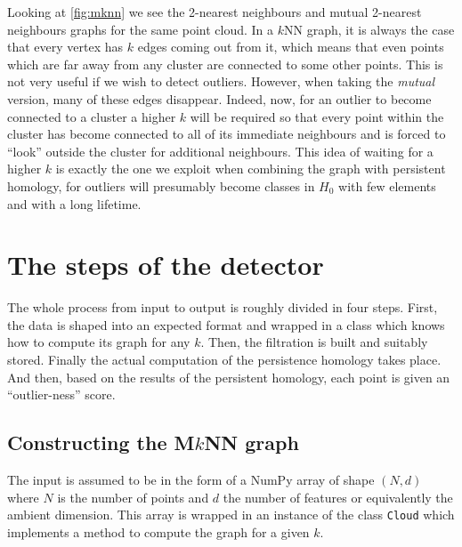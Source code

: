 \documentclass[../main.tex]{subfiles}
\begin{document}
Looking at \cref{fig:mknn} we see the 2-nearest neighbours and mutual 2-nearest neighbours
graphs for the same point cloud. In a \( k \)NN	 graph, it is always the case that every
vertex has \( k \) edges coming out from it, which means that even points which are far
away from any cluster are connected to some other points. This is not very useful if we
wish to detect outliers.  However, when taking the \emph{mutual} version, many of these
edges disappear. Indeed, now, for an outlier to become connected to a cluster a higher \(
k \) will be required so that every point within the cluster has become connected to all
of its immediate neighbours and is forced to ``look'' outside the cluster for additional
neighbours. This idea of waiting for a higher \( k \) is exactly the one we exploit when
combining the \MKNN graph with persistent homology, for outliers will presumably become
classes in	\( H_0 \) with few elements and with a long lifetime. 

\section{The steps of the detector}
The whole process from input to output is roughly divided in four steps. First, the data is
shaped into an expected format and wrapped in a class which knows how to compute its
\MKNN	graph for any \( k \). Then, the filtration is built and suitably stored. Finally
the actual computation of the persistence homology takes place. And then, based on the
results of the persistent homology, each point is given an ``outlier-ness'' score. 

\subsection{Constructing the M\texorpdfstring{\( k \)}{k}NN graph}
The input is assumed to be in the form of a \textsf{NumPy} array of shape \( (N,d) \)
where \( N \) is the number of points and \( d \) the number of features or equivalently
the ambient dimension. This array is wrapped in an instance of the class \texttt{Cloud}
which implements a method to compute the \MKNN graph for a given \( k \). 
\end{document}
